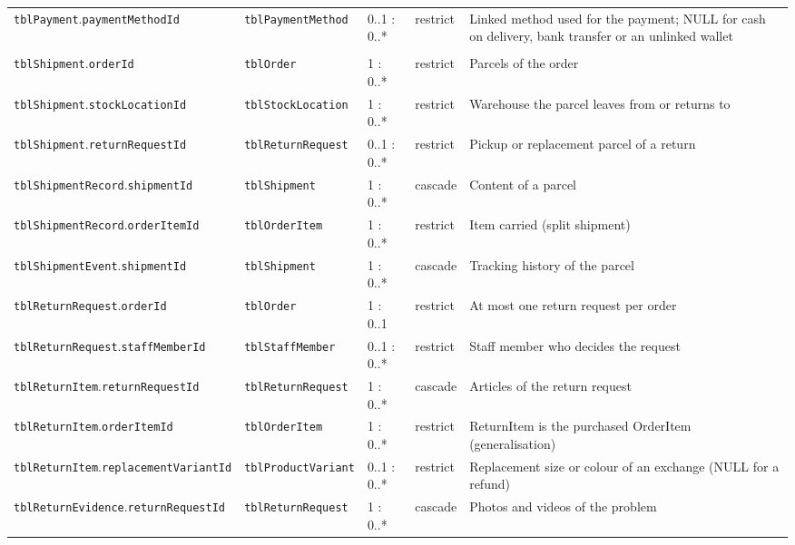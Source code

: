 {\begin{xltabular}{\textwidth}{@{}L{4.0cm} L{3.2cm} L{1.3cm} L{1.2cm} Y@{}}
\texttt{tblPayment}.\allowbreak\texttt{paymentMethodId} & \texttt{tblPaymentMethod} & 0..1 : 0..* & restrict & Linked method used for the payment; NULL for cash on delivery, bank transfer or an unlinked wallet \\ \addlinespace
{} \\
\texttt{tblShipment}.\allowbreak\texttt{orderId} & \texttt{tblOrder} & 1 : 0..* & restrict & Parcels of the order \\
\texttt{tblShipment}.\allowbreak\texttt{stockLocationId} & \texttt{tblStockLocation} & 1 : 0..* & restrict & Warehouse the parcel leaves from or returns to \\
\texttt{tblShipment}.\allowbreak\texttt{returnRequestId} & \texttt{tblReturnRequest} & 0..1 : 0..* & restrict & Pickup or replacement parcel of a return \\
\texttt{tblShipmentRecord}.\allowbreak\texttt{shipmentId} & \texttt{tblShipment} & 1 : 0..* & cascade & Content of a parcel \\
\texttt{tblShipmentRecord}.\allowbreak\texttt{orderItemId} & \texttt{tblOrderItem} & 1 : 0..* & restrict & Item carried (split shipment) \\
\texttt{tblShipmentEvent}.\allowbreak\texttt{shipmentId} & \texttt{tblShipment} & 1 : 0..* & cascade & Tracking history of the parcel \\
\texttt{tblReturnRequest}.\allowbreak\texttt{orderId} & \texttt{tblOrder} & 1 : 0..1 & restrict & At most one return request per order \\
\texttt{tblReturnRequest}.\allowbreak\texttt{staffMemberId} & \texttt{tblStaffMember} & 0..1 : 0..* & restrict & Staff member who decides the request \\
\texttt{tblReturnItem}.\allowbreak\texttt{returnRequestId} & \texttt{tblReturnRequest} & 1 : 0..* & cascade & Articles of the return request \\
\texttt{tblReturnItem}.\allowbreak\texttt{orderItemId} & \texttt{tblOrderItem} & 1 : 0..* & restrict & ReturnItem is the purchased OrderItem (generalisation) \\
\texttt{tblReturnItem}.\allowbreak\texttt{replacementVariantId} & \texttt{tblProductVariant} & 0..1 : 0..* & restrict & Replacement size or colour of an exchange (NULL for a refund) \\
\texttt{tblReturnEvidence}.\allowbreak\texttt{returnRequestId} & \texttt{tblReturnRequest} & 1 : 0..* & cascade & Photos and videos of the problem \\

\end{xltabular}}
